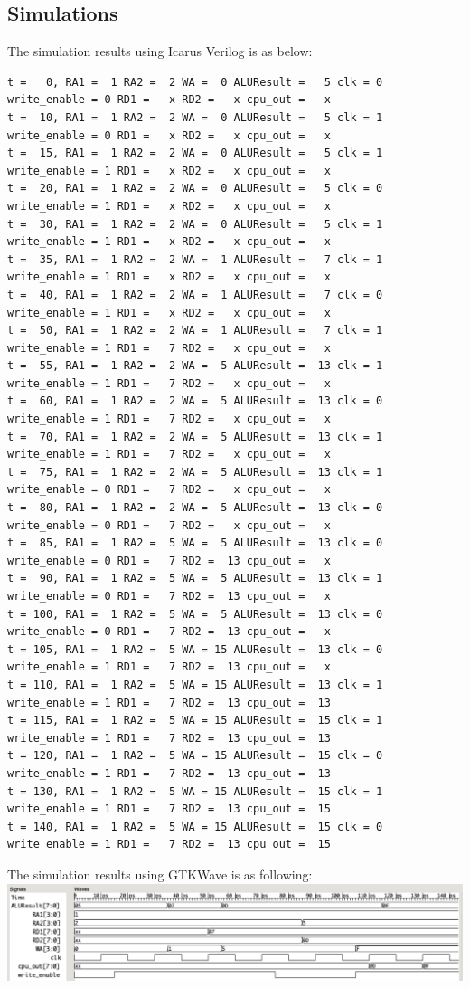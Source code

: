\documentclass{article}
\begin{document}
\subsection{Simulations}
The simulation results using Icarus Verilog is as below:
\begin{Verbatim}[fontsize = \footnotesize]
t =   0, RA1 =  1 RA2 =  2 WA =  0 ALUResult =   5 clk = 0 write_enable = 0 RD1 =   x RD2 =   x cpu_out =   x
t =  10, RA1 =  1 RA2 =  2 WA =  0 ALUResult =   5 clk = 1 write_enable = 0 RD1 =   x RD2 =   x cpu_out =   x
t =  15, RA1 =  1 RA2 =  2 WA =  0 ALUResult =   5 clk = 1 write_enable = 1 RD1 =   x RD2 =   x cpu_out =   x
t =  20, RA1 =  1 RA2 =  2 WA =  0 ALUResult =   5 clk = 0 write_enable = 1 RD1 =   x RD2 =   x cpu_out =   x
t =  30, RA1 =  1 RA2 =  2 WA =  0 ALUResult =   5 clk = 1 write_enable = 1 RD1 =   x RD2 =   x cpu_out =   x
t =  35, RA1 =  1 RA2 =  2 WA =  1 ALUResult =   7 clk = 1 write_enable = 1 RD1 =   x RD2 =   x cpu_out =   x
t =  40, RA1 =  1 RA2 =  2 WA =  1 ALUResult =   7 clk = 0 write_enable = 1 RD1 =   x RD2 =   x cpu_out =   x
t =  50, RA1 =  1 RA2 =  2 WA =  1 ALUResult =   7 clk = 1 write_enable = 1 RD1 =   7 RD2 =   x cpu_out =   x
t =  55, RA1 =  1 RA2 =  2 WA =  5 ALUResult =  13 clk = 1 write_enable = 1 RD1 =   7 RD2 =   x cpu_out =   x
t =  60, RA1 =  1 RA2 =  2 WA =  5 ALUResult =  13 clk = 0 write_enable = 1 RD1 =   7 RD2 =   x cpu_out =   x
t =  70, RA1 =  1 RA2 =  2 WA =  5 ALUResult =  13 clk = 1 write_enable = 1 RD1 =   7 RD2 =   x cpu_out =   x
t =  75, RA1 =  1 RA2 =  2 WA =  5 ALUResult =  13 clk = 1 write_enable = 0 RD1 =   7 RD2 =   x cpu_out =   x
t =  80, RA1 =  1 RA2 =  2 WA =  5 ALUResult =  13 clk = 0 write_enable = 0 RD1 =   7 RD2 =   x cpu_out =   x
t =  85, RA1 =  1 RA2 =  5 WA =  5 ALUResult =  13 clk = 0 write_enable = 0 RD1 =   7 RD2 =  13 cpu_out =   x
t =  90, RA1 =  1 RA2 =  5 WA =  5 ALUResult =  13 clk = 1 write_enable = 0 RD1 =   7 RD2 =  13 cpu_out =   x
t = 100, RA1 =  1 RA2 =  5 WA =  5 ALUResult =  13 clk = 0 write_enable = 0 RD1 =   7 RD2 =  13 cpu_out =   x
t = 105, RA1 =  1 RA2 =  5 WA = 15 ALUResult =  13 clk = 0 write_enable = 1 RD1 =   7 RD2 =  13 cpu_out =   x
t = 110, RA1 =  1 RA2 =  5 WA = 15 ALUResult =  13 clk = 1 write_enable = 1 RD1 =   7 RD2 =  13 cpu_out =  13
t = 115, RA1 =  1 RA2 =  5 WA = 15 ALUResult =  15 clk = 1 write_enable = 1 RD1 =   7 RD2 =  13 cpu_out =  13
t = 120, RA1 =  1 RA2 =  5 WA = 15 ALUResult =  15 clk = 0 write_enable = 1 RD1 =   7 RD2 =  13 cpu_out =  13
t = 130, RA1 =  1 RA2 =  5 WA = 15 ALUResult =  15 clk = 1 write_enable = 1 RD1 =   7 RD2 =  13 cpu_out =  15
t = 140, RA1 =  1 RA2 =  5 WA = 15 ALUResult =  15 clk = 0 write_enable = 1 RD1 =   7 RD2 =  13 cpu_out =  15 
\end{Verbatim}
The simulation results using GTKWave is as following:\vspace{5pt}\\
\includegraphics[width=\textwidth]{reg_file.png}
\end{document}
